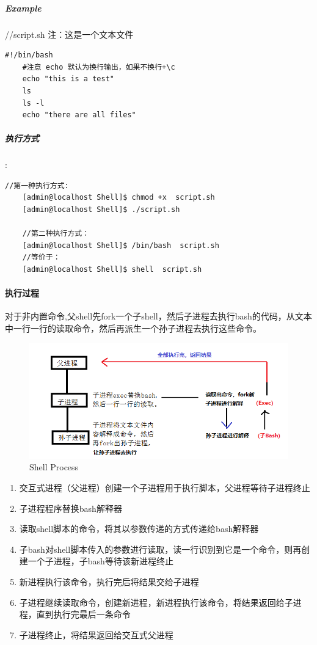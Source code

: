 \documentclass[UTF8,a4paper,12pt]{ctexbook}
\begin{document}
			\subparagraph{Example}
			 //script.sh   注：这是一个文本文件
			 \begin{lstlisting}[frame=L,xleftmargin=.06\textwidth]
	#!/bin/bash
	#注意 echo 默认为换行输出，如果不换行+\c 
	echo "this is a test"	
	ls
	ls -l
	echo "there are all files"
			 \end{lstlisting}
			 
			 \subparagraph{执行方式}:
				 \begin{lstlisting}[frame=L,xleftmargin=.06\textwidth]
	//第一种执行方式:
	[admin@localhost Shell]$ chmod +x  script.sh
	[admin@localhost Shell]$ ./script.sh
	
	//第二种执行方式：
	[admin@localhost Shell]$ /bin/bash  script.sh
	//等价于：
	[admin@localhost Shell]$ shell  script.sh
				 \end{lstlisting}
		 
			 \paragraph{执行过程}
			 	对于非内置命令,父shell先fork一个子shell，然后子进程去执行bash的代码，从文本中一行一行的读取命令，然后再派生一个孙子进程去执行这些命令。
			 	
			 	\begin{figure}[H]
			 		\centering
			 		\includegraphics[scale=0.7]{shellProcess}
			 		\caption{Shell Process}
			 	\end{figure}
				 
				 \begin{enumerate}
				 	\item 交互式进程（父进程）创建一个子进程用于执行脚本，父进程等待子进程终止
				 	\item 子进程程序替换bash解释器
				 	\item 读取shell脚本的命令，将其以参数传递的方式传递给bash解释器
				 	\item 子bash对shell脚本传入的参数进行读取，读一行识别到它是一个命令，则再创建一个子进程，子bash等待该新进程终止
				 	\item 新进程执行该命令，执行完后将结果交给子进程
				 	\item 子进程继续读取命令，创建新进程，新进程执行该命令，将结果返回给子进程，直到执行完最后一条命令
				 	\item 子进程终止，将结果返回给交互式父进程
				 \end{enumerate}
				 
\end{document}
